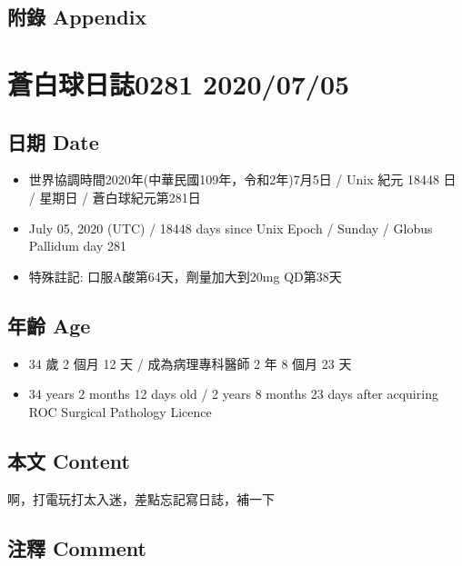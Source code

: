 \documentclass[a5paper, 11pt
]{book}
\providecommand{\tightlist}{%
  \setlength{\itemsep}{0pt}\setlength{\parskip}{0pt}}
\begin{document}
\hypertarget{ux9644ux9304-appendix-29}{%
\subsection{附錄 Appendix}\label{ux9644ux9304-appendix-29}}

\hypertarget{ux84bcux767dux7403ux65e5ux8a8c0281-20200705}{%
\section{蒼白球日誌0281
2020/07/05}\label{ux84bcux767dux7403ux65e5ux8a8c0281-20200705}}

\hypertarget{ux65e5ux671f-date-30}{%
\subsection{日期 Date}\label{ux65e5ux671f-date-30}}

\begin{itemize}
\tightlist
\item
  世界協調時間2020年(中華民國109年，令和2年)7月5日 / Unix 紀元 18448 日
  / 星期日 / 蒼白球紀元第281日
\item
  July 05, 2020 (UTC) / 18448 days since Unix Epoch / Sunday / Globus
  Pallidum day 281
\item
  特殊註記: 口服A酸第64天，劑量加大到20mg QD第38天
\end{itemize}

\hypertarget{ux5e74ux9f61-age-30}{%
\subsection{年齡 Age}\label{ux5e74ux9f61-age-30}}

\begin{itemize}
\tightlist
\item
  34 歲 2 個月 12 天 / 成為病理專科醫師 2 年 8 個月 23 天
\item
  34 years 2 months 12 days old / 2 years 8 months 23 days after
  acquiring ROC Surgical Pathology Licence
\end{itemize}

\hypertarget{ux672cux6587-content-30}{%
\subsection{本文 Content}\label{ux672cux6587-content-30}}

啊，打電玩打太入迷，差點忘記寫日誌，補一下

\hypertarget{ux6ce8ux91cb-comment-30}{%
\subsection{注釋 Comment}\label{ux6ce8ux91cb-comment-30}}
\end{document}
